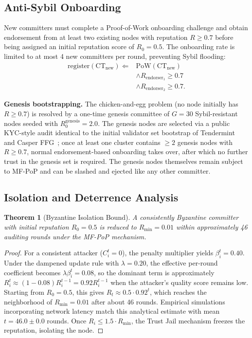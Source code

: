\documentclass[journal]{IEEEtran}
\newtheorem{theorem}{Theorem}
\begin{document}
\subsection{Anti-Sybil Onboarding}

New committers must complete a Proof-of-Work onboarding challenge and obtain endorsement from at least two existing nodes with reputation $R \geq 0.7$ before being assigned an initial reputation score of $R_0 = 0.5$. The onboarding rate is limited to at most 4 new committers per round, preventing Sybil flooding:
\begin{equation}
\begin{aligned}
\text{register}(\text{CT}_{\text{new}}) \Leftarrow {}& \text{PoW}(\text{CT}_{\text{new}}) \\
&\land R_{\text{endorser}_1} \geq 0.7 \\
&\land R_{\text{endorser}_2} \geq 0.7.
\end{aligned}
\label{eq:onboarding}
\end{equation}

\textbf{Genesis bootstrapping.} The chicken-and-egg problem (no node initially has $R \ge 0.7$) is resolved by a one-time genesis committee of $G = 30$ Sybil-resistant nodes seeded with $R_0^{\text{genesis}} = 2.0$. The genesis nodes are selected via a public KYC-style audit identical to the initial validator set bootstrap of Tendermint~\cite{kwon2014tendermint} and Casper FFG~\cite{buterin2017casper}; once at least one cluster contains $\ge 2$ genesis nodes with $R \ge 0.7$, normal endorsement-based onboarding takes over, after which no further trust in the genesis set is required. The genesis nodes themselves remain subject to MF-PoP and can be slashed and ejected like any other committer.

\subsection{Isolation and Deterrence Analysis}

\begin{theorem}[Byzantine Isolation Bound]
\label{thm:isolation}
A consistently Byzantine committer with initial reputation $R_0 = 0.5$ is reduced to $R_{\min} = 0.01$ within approximately 46 auditing rounds under the MF-PoP mechanism.
\end{theorem}

\begin{proof}
For a consistent attacker ($C_i^t = 0$), the penalty multiplier yields $\beta_i^t = 0.40$. Under the dampened update rule with $\lambda = 0.20$, the effective per-round coefficient becomes $\lambda \beta_i^t = 0.08$, so the dominant term is approximately $R_i^t \approx (1 - 0.08) R_i^{t-1} = 0.92 R_i^{t-1}$ when the attacker's quality score remains low. Starting from $R_0 = 0.5$, this gives $R_t \approx 0.5 \cdot 0.92^t$, which reaches the neighborhood of $R_{\min} = 0.01$ after about 46 rounds. Empirical simulations incorporating network latency match this analytical estimate with mean $t = 46.0 \pm 0.0$ rounds. Once $R_i \leq 1.5 \cdot R_{\min}$, the Trust Jail mechanism freezes the reputation, isolating the node.
\end{proof}
\end{document}
